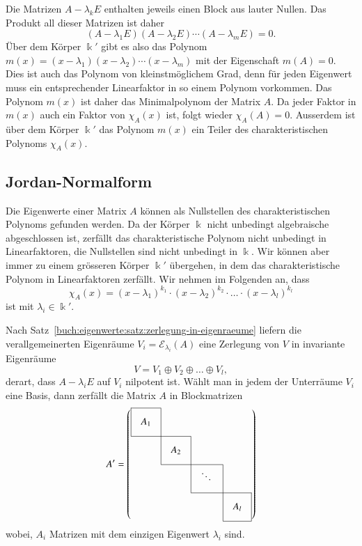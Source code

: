 Die Matrizen $A-\lambda_kE$ enthalten jeweils einen Block aus lauter
Nullen.
Das Produkt all dieser Matrizen  ist daher
\[
(A-\lambda_1E)
(A-\lambda_2E)
\cdots
(A-\lambda_mE)
=
0.
\]
Über dem Körper $\Bbbk'$ gibt es also das Polynom
$m(x)=(x-\lambda_1)(x-\lambda_2)\cdots(x-\lambda_m)$ mit der Eigenschaft
$m(A)=0$.
Dies ist auch das Polynom von kleinstmöglichem Grad, denn für jeden
Eigenwert muss ein entsprechender Linearfaktor in so einem Polynom vorkommen.
Das Polynom $m(x)$ ist daher das Minimalpolynom der Matrix $A$.
Da jeder Faktor in $m(x)$ auch ein Faktor von $\chi_A(x)$ ist,
folgt wieder $\chi_A(A)=0$.
Ausserdem ist über dem Körper $\Bbbk'$ das Polynom $m(x)$ ein Teiler
des charakteristischen Polynoms $\chi_A(x)$.

\subsection{Jordan-Normalform
\label{buch:subsection:jordan-normalform}}
Die Eigenwerte einer Matrix $A$ können als Nullstellen des 
charakteristischen Polynoms gefunden werden.
Da der Körper $\Bbbk$ nicht unbedingt algebraische abgeschlossen ist,
zerfällt das charakteristische Polynom nicht unbedingt in Linearfaktoren,
die Nullstellen sind nicht unbedingt in $\Bbbk$.
Wir können aber immer zu einem grösseren Körper $\Bbbk'$ übergehen,
in dem das charakteristische Polynom in Linearfaktoren zerfällt.
Wir nehmen im Folgenden an, dass 
\[
\chi_A(x)
=
(x-\lambda_1)^{k_1}
\cdot
(x-\lambda_2)^{k_2}
\cdot
\dots
\cdot
(x-\lambda_l)^{k_l}
\]
ist mit $\lambda_i\in\Bbbk'$.

Nach Satz~\ref{buch:eigenwerte:satz:zerlegung-in-eigenraeume} liefern
die verallgemeinerten Eigenräume $V_i=\mathcal{E}_{\lambda_i}(A)$ eine
Zerlegung von $V$ in invariante Eigenräume
\[
V=V_1\oplus V_2\oplus \dots\oplus V_l,
\]
derart, dass $A-\lambda_iE$ auf $V_i$ nilpotent ist.
Wählt man in jedem der Unterräume $V_i$ eine Basis, dann zerfällt die
Matrix $A$ in Blockmatrizen
\begin{equation}
\def\temp#1{\multicolumn{1}{|c}{\raisebox{0pt}[17pt][12pt]{\phantom{x}$#1\mathstrut$}\phantom{x}}}
A'
=\left(
\begin{array}{cccc}
\cline{1-1}
\temp{A_{1}} &\multicolumn{1}{|c}{}&        &           \\
\cline{1-2}
          &\temp{A_{2}}&\multicolumn{1}{|c}{}&           \\
\cline{2-3}
          &           &\temp{\ddots}&\multicolumn{1}{|c}{}\\
\cline{3-4}
          &           &        &\multicolumn{1}{|c|}{\raisebox{0pt}[17pt][12pt]{\phantom{x}$A_{l}$}\phantom{x}}\\
\cline{4-4}
\end{array}
\right)
\label{buch:eigenwerte:eqn:allgnilpotent}
\end{equation}
wobei, $A_i$ Matrizen mit dem einzigen Eigenwert $\lambda_i$ sind.


